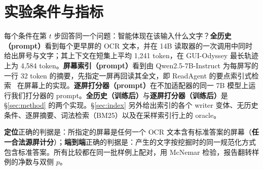 \section{实验条件与指标}
每个条件在第 $t$ 步回答同一个问题：智能体现在该输入什么文字？\textbf{全历史（prompt）}看到每个更早屏的 OCR 文本，并在 14B 读取器的一次调用中同时给出屏号与文字；其上下文在短集上平均 1,241 token，在 GUI-Odyssey 最长轨迹上为 4,584 token。\textbf{屏幕索引（prompt）}看到由 Qwen2.5-7B-Instruct 为每屏写的一行 32 token 的摘要，先指定一屏再回读其全文，即 ReadAgent 的要点索引式检索~\citep{readagent} 在屏幕上的实现。\textbf{逐屏打分器（prompt）}在不加适配器的同一 7B 模型上运行我们打分器的 prompt。\textbf{全历史（训练后）}与\textbf{逐屏打分器（训练后）}是 \S\ref{sec:method} 的两个实现。\S\ref{sec:index} 另外给出索引的各个 writer 变体、无历史条件、逐屏摘要、词法检索（BM25）以及在采样索引行上的 oracle。

\textbf{定位}正确的判据是：所指定的屏幕是任何一个 OCR 文本含有标准答案的屏幕（\textbf{任一合法源屏计分}）；\textbf{端到端}正确的判据是：产生的文字按挖掘时的同一规范化方式包含标准答案。所有比较都在同一批样例上配对，用 McNemar 检验，报告翻转样例的净数与双侧 $p$。
